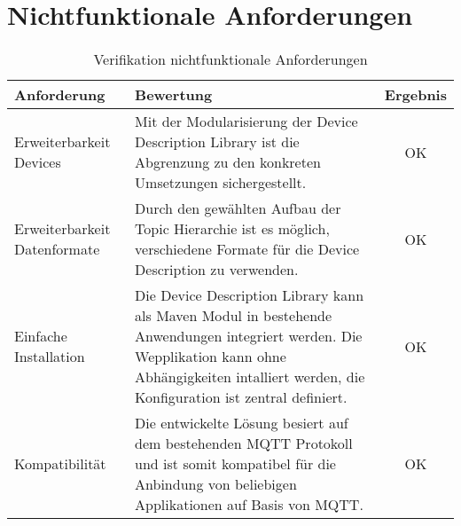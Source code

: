 \section{Nichtfunktionale Anforderungen}

\begin{table}[H]
\begin{tabularx}{\textwidth}{|l|X|c|}

 \hline \rowcolor{lightgray}
 {\bf Anforderung } & {\bf Bewertung } & {\bf Ergebnis} \\  \hline
 
 Erweiterbarkeit Devices & Mit der Modularisierung der Device Description Library ist die Abgrenzung zu den konkreten Umsetzungen sichergestellt. & OK \\ \hline

 Erweiterbarkeit Datenformate   & Durch den gewählten Aufbau der Topic Hierarchie ist es möglich, verschiedene Formate für die Device Description zu verwenden. & OK \\ \hline

 Einfache Installation    & Die Device Description Library kann als Maven Modul in bestehende Anwendungen integriert werden. Die Wepplikation kann ohne Abhängigkeiten intalliert werden, die Konfiguration ist zentral definiert. & OK \\ \hline

 Kompatibilität     & Die entwickelte Lösung besiert auf dem bestehenden MQTT Protokoll und ist somit kompatibel für die Anbindung von beliebigen Applikationen auf Basis von MQTT. & OK \\ \hline


\end{tabularx}
\caption{Verifikation nichtfunktionale Anforderungen}
\end{table}
